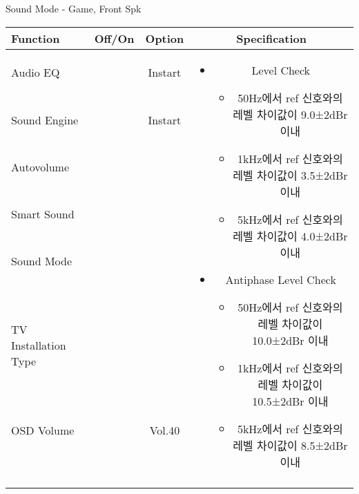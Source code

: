 \begin{frame}[t]{Sound Mode - Game, Front Spk}
\begin{tiny}
\begin{tabular}{@{}lccc@{}}
\toprule
Function & Off/On & Option & Specification \\
\midrule
Audio EQ & \color{black}{Off} & Instart &
\multirow{10}{60mm}{
\begin{itemize}
    \item Level Check
    \begin{itemize}
        \item 50Hz에서 ref 신호와의 레벨 차이값이 9.0±2dBr 이내
        \item 1kHz에서 ref 신호와의 레벨 차이값이 3.5±2dBr 이내
        \item 5kHz에서 ref 신호와의 레벨 차이값이 4.0±2dBr 이내
    \end{itemize}
    \item Antiphase Level Check
    \begin{itemize}
        \item 50Hz에서 ref 신호와의 레벨 차이값이 10.0±2dBr 이내
        \item 1kHz에서 ref 신호와의 레벨 차이값이 10.5±2dBr 이내
        \item 5kHz에서 ref 신호와의 레벨 차이값이 8.5±2dBr 이내
    \end{itemize}
\end{itemize}
} \\
Sound Engine & \color{blue}{On} & Instart & \\
Autovolume & \color{black}{Off} & & \\
Smart Sound & \color{black}{Off} & & \\
Sound Mode & \color{blue}{On} & \color{blue}{Game} & \\
TV Installation Type & \color{blue}{On} & \color{black}{Standtype1} & \\
OSD Volume & \color{blue}{On} & Vol.40 & \\
& & & \\
& & & \\
& & & \\
& & & \\
\midrule
\end{tabular}
\end{tiny}

\end{frame}


